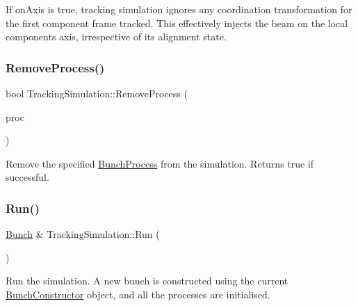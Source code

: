 If on\+Axis is true, tracking simulation ignores any coordination transformation for the first component frame tracked. This effectively injects the \textquotesingle{}beam\textquotesingle{} on the local components axis, irrespective of its alignment state. \mbox{\label{classTrackingSimulation_a235e5a69ec05d1351e623fee1f9c054f}} 
\subsubsection{\texorpdfstring{Remove\+Process()}{RemoveProcess()}}
{\footnotesize\ttfamily bool Tracking\+Simulation\+::\+Remove\+Process (\begin{DoxyParamCaption}\item[{\hyperlink{classBunchProcess}{Bunch\+Process} $\ast$}]{proc }\end{DoxyParamCaption})}

Remove the specified \hyperlink{classBunchProcess}{Bunch\+Process} from the simulation. Returns true if successful. \mbox{\label{classTrackingSimulation_a09502165e1c358b1b30ff35a26910a1d}} 
\subsubsection{\texorpdfstring{Run()}{Run()}}
{\footnotesize\ttfamily \hyperlink{classBunch}{Bunch} \& Tracking\+Simulation\+::\+Run (\begin{DoxyParamCaption}{ }\end{DoxyParamCaption})\hspace{0.3cm}{\ttfamily [virtual]}}

Run the simulation. A new bunch is constructed using the current \hyperlink{classBunchConstructor}{Bunch\+Constructor} object, and all the processes are initialised. \mbox{\label{classTrackingSimulation_a0de2bbd2e382637a6372db08f6d69ffc}} 
